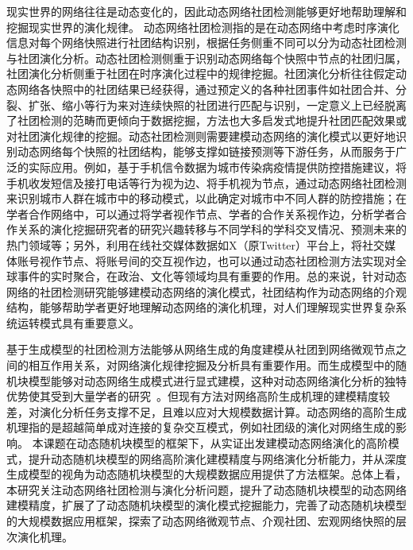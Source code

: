 现实世界的网络往往是动态变化的，因此动态网络社团检测能够更好地帮助理解和挖掘现实世界的演化规律。
动态网络社团检测指的是在动态网络中考虑时序演化信息对每个网络快照进行社团结构识别，根据任务侧重不同可以分为动态社团检测与社团演化分析。动态社团检测侧重于识别动态网络每个快照中节点的社团归属，社团演化分析侧重于社团在时序演化过程中的规律挖掘。社团演化分析往往假定动态网络各快照中的社团结果已经获得，通过预定义的各种社团事件如社团合并、分裂、扩张、缩小等行为\cite{palla2007quantifying}来对连续快照的社团进行匹配与识别，一定意义上已经脱离了社团检测的范畴而更倾向于数据挖掘，方法也大多启发式地提升社团匹配效果或对社团演化规律的挖掘。动态社团检测则需要建模动态网络的演化模式以更好地识别动态网络每个快照的社团结构，能够支撑如链接预测等下游任务，从而服务于广泛的实际应用\cite{kumar2024community}。例如，基于手机信令数据为城市传染病疫情提供防控措施建议\cite{he2024urban}，将手机收发短信及接打电话等行为视为边、将手机视为节点，通过动态网络社团检测来识别城市人群在城市中的移动模式，以此确定对城市中不同人群的防控措施；在学者合作网络中，可以通过将学者视作节点、学者的合作关系视作边，分析学者合作关系的演化挖掘研究者的研究兴趣转移与不同学科的学科交叉情况、预测未来的热门领域等\cite{mariani2024collective,wang2022weak}；另外，利用在线社交媒体数据如X（原Twitter）平台上，将社交媒体账号视作节点、将账号间的交互视作边，也可以通过动态社团检测方法实现对全球事件的实时聚合，在政治、文化等领域均具有重要的作用\cite{ma2024knowledge}。总的来说，针对动态网络的社团检测研究能够建模动态网络的演化模式，社团结构作为动态网络的介观结构，能够帮助学者更好地理解动态网络的演化机理，对人们理解现实世界复杂系统运转模式具有重要意义。

基于生成模型的社团检测方法能够从网络生成的角度建模从社团到网络微观节点之间的相互作用关系，对网络演化规律挖掘及分析具有重要作用。而生成模型中的随机块模型能够对动态网络生成模式进行显式建模，这种对动态网络演化分析的独特优势使其受到大量学者的研究~\cite{LI2024128169}。但现有方法对网络高阶生成机理的建模精度较差，对演化分析任务支撑不足，且难以应对大规模数据计算。动态网络的高阶生成机理指的是超越简单成对连接的复杂交互模式，例如社团级的演化对网络生成的影响。
本课题在动态随机块模型的框架下，从实证出发建模动态网络演化的高阶模式，提升动态随机块模型的网络高阶演化建模精度与网络演化分析能力，并从深度生成模型的视角为动态随机块模型的大规模数据应用提供了方法框架。总体上看，本研究关注动态网络社团检测与演化分析问题，提升了动态随机块模型的动态网络建模精度，扩展了了动态随机块模型的演化模式挖掘能力，完善了动态随机块模型的大规模数据应用框架，探索了动态网络微观节点、介观社团、宏观网络快照的层次演化机理。






